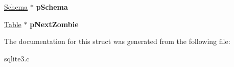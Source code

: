 \begin{DoxyCompactItemize}
\item 
\hyperlink{structSchema}{Schema} $\ast$ {\bfseries p\+Schema}\hypertarget{structTable_a1d6ce038a061722cebaeba0f3ffceacf}{}\label{structTable_a1d6ce038a061722cebaeba0f3ffceacf}

\item 
\hyperlink{structTable}{Table} $\ast$ {\bfseries p\+Next\+Zombie}\hypertarget{structTable_ae365eb0d8f6d3cb39f3908323cba45e4}{}\label{structTable_ae365eb0d8f6d3cb39f3908323cba45e4}

\end{DoxyCompactItemize}


The documentation for this struct was generated from the following file\+:\begin{DoxyCompactItemize}
\item 
sqlite3.\+c\end{DoxyCompactItemize}
